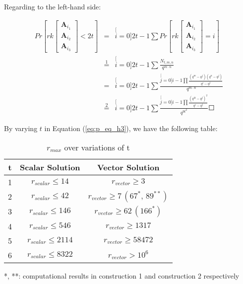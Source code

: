 Regarding to the left-hand side:

\begin{eqnarray}
Pr\left[rk\left[\begin{array}{c}
\boldsymbol{A}_{i_{1}}\\
\boldsymbol{A}_{i_{2}}\\
\boldsymbol{A}_{i_{3}}
\end{array}\right]<2t\right] & = & \stackrel[i=0]{2t-1}{\mathop{\sum}}Pr\left[rk\left[\begin{array}{c}
\boldsymbol{A}_{i_{1}}\\
\boldsymbol{A}_{i_{2}}\\
\boldsymbol{A}_{i_{3}}
\end{array}\right]=i\right]\nonumber \\
 & \overset{1}{=} & \stackrel[i=0]{2t-1}{\mathop{\sum}}\frac{N_{t,m,n}}{q^{m\cdot n}}\nonumber \\
 & = & \stackrel[i=0]{2t-1}{\mathop{\sum}}\frac{\stackrel[j=0]{i-1}{\mathop{\prod}}\frac{\left(q^{m}-q^{j}\right)\left(q^{n}-q^{j}\right)}{q^{i}-q^{j}}}{q^{m\cdot n}}\nonumber \\
 & \overset{2}{=} & \stackrel[i=0]{2t-1}{\mathop{\sum}}\frac{\stackrel[j=0]{i-1}{\mathop{\prod}}\frac{\left(q^{3t}-q^{j}\right)^{2}}{q^{i}-q^{j}}}{q^{9t^{2}}}\Square\label{eq:p_eq_h3}
\end{eqnarray}

By varying $t$ in Equation (\ref{eq:p_eq_h3}), we have the following
table:

\begin{table}[h]
\caption{$r_{max}$ over variations of t\label{tab:rmax_over_t}}

\begin{tabular}{|c|c|c|}
\hline 
t & Scalar Solution & Vector Solution\tabularnewline
\hline 
\hline 
1 & $r_{scalar}\leq14$ & $r_{vector}\geq3$\tabularnewline
\hline 
2 & $r_{scalar}\leq42$ & $r_{vector}\geq7\,\left(67^{*},\,89^{**}\right)$\tabularnewline
\hline 
3 & $r_{scalar}\leq146$ & $r_{vector}\geq62\,\left(166^{*}\right)$ \tabularnewline
\hline 
4 & $r_{scalar}\leq546$ & $r_{vector}\geq1317$\tabularnewline
\hline 
5 & $r_{scalar}\leq2114$ & $r_{vector}\geq58472$\tabularnewline
\hline 
6 & $r_{scalar}\leq8322$ & $r_{vector}>10^{6}$\tabularnewline
\hline 
\end{tabular}

{*}, {*}{*}: computational results in construction 1 and construction
2 respectively
\end{table}

